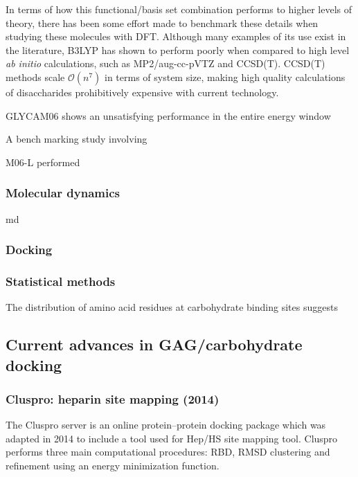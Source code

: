 \documentclass[journal=jctcce,manuscript=article]{achemso}
\begin{document}
{In terms of how this functional/basis set combination performs to higher levels of theory, there has been some effort made to benchmark these details when studying these molecules with \ac{DFT}. Although many examples of its use exist in the literature, B3LYP has shown to perform poorly when compared to high level \textit{ab initio} calculations, such as MP2/aug-cc-pVTZ and CCSD(T). CCSD(T) methods scale $\mathcal{O}(n^{7})$ in terms of system size, making high quality calculations of disaccharides prohibitively expensive with current technology. 

GLYCAM06 shows an unsatisfying performance in the entire energy window

A bench marking study involving 

M06-L performed 

\subsubsection{Molecular dynamics}
\Ac{md}

\subsubsection{Docking}

\subsubsection{Statistical methods}

The distribution of amino acid residues at carbohydrate binding sites suggests

\subsection{Current advances in GAG/carbohydrate docking}

\subsubsection{Cluspro: heparin site mapping (2014)}

The Cluspro server is an online protein--protein docking package which was adapted in 2014 to include a tool used for \ac{Hep}/\ac{HS} site mapping tool.\cite{Comeau2007ClusPro:Server, Mottarella2014DockingProteins,Kozakov2017TheDocking.} 
Cluspro performs three main computational procedures: \ac{RBD}, \ac{RMSD} clustering and refinement using an energy minimization function.\cite{Kozakov2017TheDocking.} 


}
\end{document}

